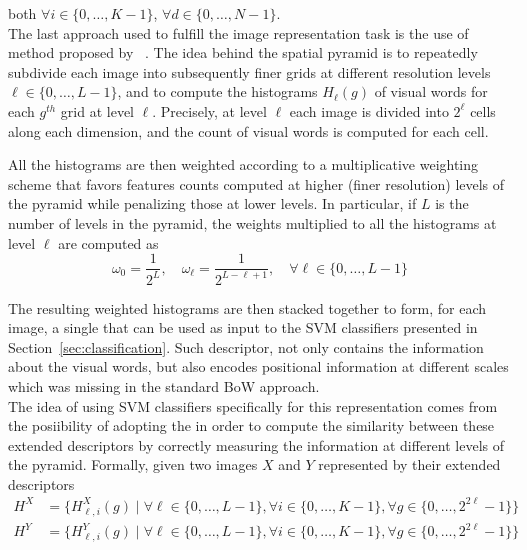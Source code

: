 \documentclass[../main.tex]{subfiles}
\begin{document}
both $\forall i \in \{0, \ldots, K-1\}$, $\forall d \in \{0, \ldots, N-1\}$.\\
The last approach used to fulfill the image representation task is the
use of  method proposed by ~\cite{lazebnik}. 
The idea behind the spatial pyramid is to repeatedly subdivide each image into
subsequently finer grids at different resolution levels $\ell \in
\{0,\dots,L-1\}$, and to compute the histograms $H_{\ell}(g)$ of visual words
for each $g^{th}$ grid at level $\ell$. Precisely, at level $\ell$ each
image is divided into $2^{\ell}$ cells along each dimension, and the count of
visual words is computed for each cell.

\pagebreak
All the histograms are then weighted according to a multiplicative weighting
scheme that favors features counts computed at higher (finer resolution) levels
of the pyramid while penalizing those at lower levels. In particular, if $L$ is
the number of levels in the pyramid, the weights multiplied to all the histograms
at level $\ell$ are computed as
\begin{equation}
	\omega_0 = \frac{1}{2^{L}},
	\quad
	\omega_{\ell} = \frac{1}{2^{L-\ell+1}},
	\quad
	\forall \ell \in \{0, \ldots, L-1\}
\end{equation}

The resulting weighted histograms are then stacked together to form, for each
image, a single  that can be used as input
to the SVM classifiers presented in Section~\ref{sec:classification}. Such
descriptor, not only contains the information about the visual words, but also
encodes positional information at different scales which was missing in the
standard BoW approach.\\
The idea of using SVM classifiers specifically for this representation comes
from the posiibility of adopting the  in order to
compute the similarity between these extended descriptors by correctly measuring
the information at different levels of the pyramid. Formally, given two images
$X$ and $Y$ represented by their extended descriptors
\begin{equation*}
  \begin{aligned}
	H^{X} &= \{H_{\ell, i}^{X}(g) \mid  \forall \ell \in \{0,\dots,L-1\}, \forall i \in \{0,\dots,K-1\}, \forall g \in \{0,\dots,2^{2 \ell}-1\}\} \\
	H^{Y} &= \{H_{\ell, i}^{Y}(g) \mid  \forall \ell \in \{0,\dots,L-1\}, \forall i \in \{0,\dots,K-1\}, \forall g \in \{0,\dots,2^{2 \ell}-1\}\}
  \end{aligned}
\end{equation*}
\end{document}

